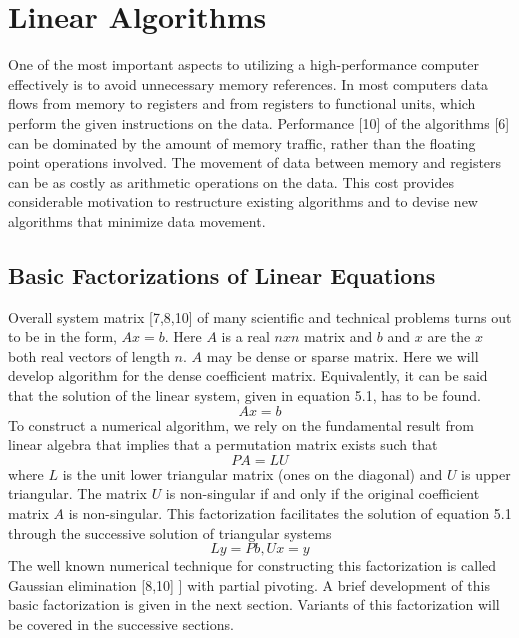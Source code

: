 \chapter{Linear Algorithms}
One of the most important aspects to utilizing a high-performance computer effectively is to avoid unnecessary memory references. In most computers data flows
from memory to registers and from registers to functional units, which perform the given instructions on the data. Performance [10] of the algorithms [6] can
be dominated by the amount of memory traffic, rather than the floating point operations involved. The movement of data between memory and registers can be as
costly as arithmetic operations on the data. This cost provides considerable motivation to restructure existing algorithms and to devise new algorithms that
minimize data movement.

\section{Basic Factorizations of Linear Equations}
Overall system matrix [7,8,10] of many scientific and technical problems turns out to be in the form, $Ax=b$. Here $A$ is a real $nxn$ matrix and $b$ and $x$
are the $x$ both real vectors of length $n$. $A$ may be dense or sparse matrix. Here we will develop algorithm for the dense coefficient matrix. Equivalently,
it can be said that the solution of the linear system, given in equation 5.1, has to be found.
\begin{equation}
Ax=b
\end{equation}
\hspace{1in} To construct a numerical algorithm, we rely on the fundamental result from linear algebra that implies that a permutation matrix exists such that 
\begin{equation}
PA = LU
\end{equation}
where $L$ is the unit lower triangular matrix (ones on the diagonal) and $U$ is upper triangular. The matrix $U$ is non-singular if and only if the original
coefficient matrix $A$ is non-singular. This factorization facilitates the solution of equation 5.1 through the successive solution of triangular systems
\begin{equation}
Ly = Pb, Ux = y
\end{equation}
The well known numerical technique for constructing this factorization is called Gaussian elimination [8,10] ] with partial pivoting. A brief development of
this basic factorization is given in the next section. Variants of this factorization will be covered in the successive sections.

